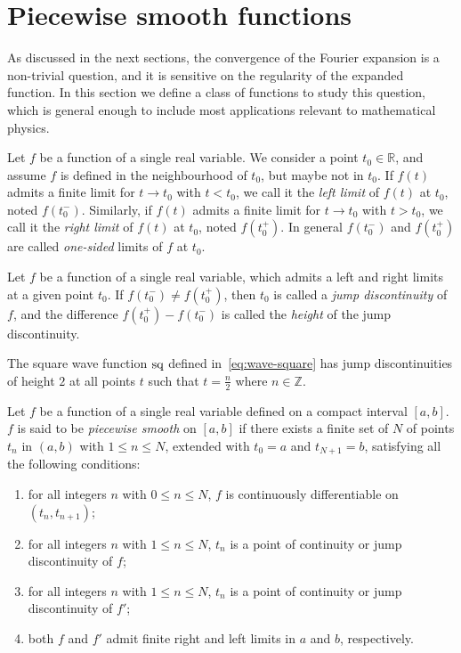 \section{Piecewise smooth functions}
As discussed in the next sections, the convergence of the Fourier expansion is a non-trivial
question, and it is sensitive on the regularity of the expanded function. In this section
we define a class of functions to study this question, which is general enough to include
most applications relevant to mathematical physics.
\begin{definition}
  Let $f$ be a function of a single real variable. We consider a point $t_0\in\mathbb{R}$,
  and assume $f$ is defined in the neighbourhood of $t_0$, but maybe not in $t_0$. If $f(t)$ admits a finite limit for $t\to t_0$ with $t<t_0$, we call it the
  \emph{left limit} of $f(t)$ at $t_0$, noted $f(t_0^-)$. Similarly, if $f(t)$ admits a
  finite limit for $t\to t_0$ with $t>t_0$, we call it the \emph{right limit} of $f(t)$ at
  $t_0$, noted $f(t_0^+)$. In general $f(t_0^-)$ and $f(t_0^+)$ are called \emph{one-sided} limits
  of $f$ at $t_0$.
\end{definition}
\begin{definition}
  Let $f$ be a function of a single real variable, which admits a left and right limits at
  a given point $t_0$. If $f(t_0^-)\neq f(t_0^+)$, then $t_0$ is called a \emph{jump
  discontinuity} of $f$, and the difference $f(t_0^+)-f(t_0^-)$ is called the
  \emph{height} of the jump discontinuity.
\end{definition}
\begin{example}
  The square wave function $\operatorname{sq}$ defined in~\cref{eq:wave-square} has jump discontinuities
  of height $2$ at all points $t$ such that $t=\frac{n}{2}$ where $n\in\mathbb{Z}$.
\end{example}
\begin{definition}
  \label{def:pw-smooth}
  Let $f$ be a function of a single real variable defined on a compact interval $[a,b]$.
  $f$ is said to be \emph{piecewise smooth} on $[a,b]$ if there exists a finite set of $N$
  of points $t_n$ in $(a,b)$ with $1\leq n\leq N$, extended with $t_0=a$ and $t_{N+1}=b$,
  satisfying all the following conditions:
  \begin{enumerate}
    \item for all integers $n$ with $0\leq n\leq N$, $f$ is continuously differentiable on
      $(t_n,t_{n+1})$;
    \item for all integers $n$ with $1\leq n\leq N$, $t_n$ is a point of continuity or
      jump discontinuity of $f$;
    \item for all integers $n$ with $1\leq n\leq N$, $t_n$ is a point of continuity or
      jump discontinuity of $f'$;
    \item both $f$ and $f'$ admit finite right and left limits in $a$ and $b$,
      respectively.
  \end{enumerate}
\end{definition}
